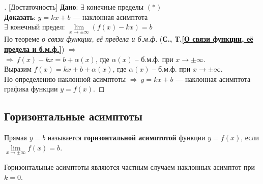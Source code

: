\begin{proof}[][Достаточность]
	\textbf{Дано}: $\exists$ конечные пределы $(*)$\\
	\textbf{Доказать}: $y=kx+b$ --- наклонная асимптота\\[1ex]
	$\exists$ конечный предел: $\lim\limits_{x \to \pm \infty} (f(x) - kx) = b$\\
	По теореме \textit{о связи функции, её предела и б.м.ф.} (\textbf{С.\pageref{О связи функции, её предела и б.м.ф.}, Т.\ref{О связи функции, её предела и б.м.ф.}}) $\Rightarrow$\\
	$\Rightarrow\ f(x) - kx = b + \alpha(x)$, где $\alpha(x)$ -- б.м.ф. при $x \to \pm \infty$.\\
	Выразим $f(x) = kx + b + \alpha(x)$, где $\alpha(x)$ -- б.м.ф. при $x \to \pm \infty$.\\
	По определению наклонной асимптоты $\Rightarrow\ y = kx + b$ --- наклонная асимптота графика функции $y=f(x)$.
\end{proof}
\newpage
\subsection{Горизонтальные асимптоты}
\begin{definition}
	Прямая $y=b$ называется \textbf{горизонтальной асимптотой} функции $y=f(x)$, если $\lim\limits_{x \to \pm \infty} f(x) = b$.
\end{definition}
\begin{corollary*}
	Горизонтальные асимптоты являются частным случаем наклонных асимптот при $k=0$.
\end{corollary*}
\zerocounter
